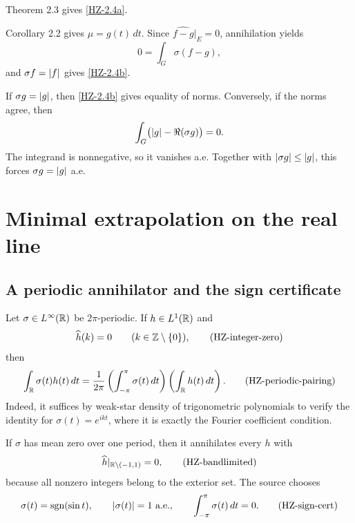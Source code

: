 
\begin{argument}
\item Theorem 2.3 gives \eqref{HZ-2.4a}.
\item Corollary 2.2 gives $\mu=g(t)\,dt$. Since $\widehat{f-g}|_E=0$, annihilation yields
\[
  0=\int_G\sigma(f-g),
\]
and $\sigma f=\left\lvert f\right\rvert$ gives \eqref{HZ-2.4b}.
\item If $\sigma g=\left\lvert g\right\rvert$, then \eqref{HZ-2.4b} gives equality of norms. Conversely, if the norms agree, then
\[
  \int_G\bigl(\left\lvert g\right\rvert-\Re(\sigma g)\bigr)=0.
\]
The integrand is nonnegative, so it vanishes a.e. Together with $\left\lvert \sigma g\right\rvert\le\left\lvert g\right\rvert$, this forces $\sigma g=\left\lvert g\right\rvert$ a.e.
\end{argument}

\section{Minimal extrapolation on the real line}


\subsection{A periodic annihilator and the sign certificate}

Let $\sigma\in L^\infty(\mathbb{R})$ be $2\pi$-periodic. If $h\in L^1(\mathbb{R})$ and
\[
  \widehat h(k)=0\qquad(k\in\mathbb{Z}\setminus\{0\}),
  \tag{HZ-integer-zero}\label{HZ-integer-zero}
\]
then
\[
  \int_{\mathbb{R}}\sigma(t)h(t)\,dt
  =\frac1{2\pi}\left(\int_{-\pi}^{\pi}\sigma(t)\,dt\right)
       \left(\int_{\mathbb{R}}h(t)\,dt\right).
  \tag{HZ-periodic-pairing}\label{HZ-periodic-pairing}
\]
Indeed, it suffices by weak-star density of trigonometric polynomials to verify the identity for $\sigma(t)=e^{ikt}$, where it is exactly the Fourier coefficient condition.

If $\sigma$ has mean zero over one period, then it annihilates every $h$ with
\[
  \widehat h|_{\mathbb{R}\setminus(-1,1)}=0,
  \tag{HZ-bandlimited}\label{HZ-bandlimited}
\]
because all nonzero integers belong to the exterior set. The source chooses
\[
  \sigma(t)=\operatorname{sgn}(\sin t),
  \qquad\left\lvert \sigma(t)\right\rvert=1\text{ a.e.},
  \qquad\int_{-\pi}^{\pi}\sigma(t)\,dt=0.
  \tag{HZ-sign-cert}\label{HZ-sign-cert}
\]

